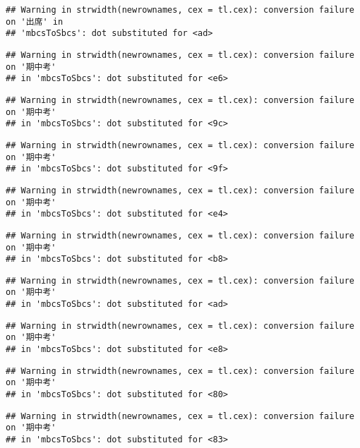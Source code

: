 \documentclass[
]{book}
\begin{document}
\begin{verbatim}
## Warning in strwidth(newrownames, cex = tl.cex): conversion failure on '出席' in
## 'mbcsToSbcs': dot substituted for <ad>
\end{verbatim}

\begin{verbatim}
## Warning in strwidth(newrownames, cex = tl.cex): conversion failure on '期中考'
## in 'mbcsToSbcs': dot substituted for <e6>
\end{verbatim}

\begin{verbatim}
## Warning in strwidth(newrownames, cex = tl.cex): conversion failure on '期中考'
## in 'mbcsToSbcs': dot substituted for <9c>
\end{verbatim}

\begin{verbatim}
## Warning in strwidth(newrownames, cex = tl.cex): conversion failure on '期中考'
## in 'mbcsToSbcs': dot substituted for <9f>
\end{verbatim}

\begin{verbatim}
## Warning in strwidth(newrownames, cex = tl.cex): conversion failure on '期中考'
## in 'mbcsToSbcs': dot substituted for <e4>
\end{verbatim}

\begin{verbatim}
## Warning in strwidth(newrownames, cex = tl.cex): conversion failure on '期中考'
## in 'mbcsToSbcs': dot substituted for <b8>
\end{verbatim}

\begin{verbatim}
## Warning in strwidth(newrownames, cex = tl.cex): conversion failure on '期中考'
## in 'mbcsToSbcs': dot substituted for <ad>
\end{verbatim}

\begin{verbatim}
## Warning in strwidth(newrownames, cex = tl.cex): conversion failure on '期中考'
## in 'mbcsToSbcs': dot substituted for <e8>
\end{verbatim}

\begin{verbatim}
## Warning in strwidth(newrownames, cex = tl.cex): conversion failure on '期中考'
## in 'mbcsToSbcs': dot substituted for <80>
\end{verbatim}

\begin{verbatim}
## Warning in strwidth(newrownames, cex = tl.cex): conversion failure on '期中考'
## in 'mbcsToSbcs': dot substituted for <83>
\end{verbatim}
\end{document}
